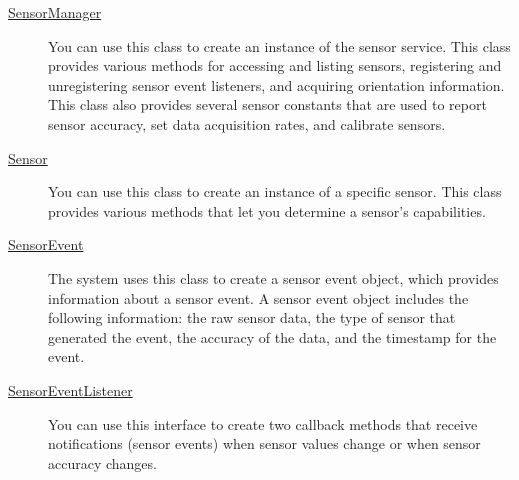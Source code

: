\begin{description}
\item [  \href{https://developer.android.com/reference/android/hardware/SensorManager.html}{SensorManager}]

  You can use this class to create an instance of the sensor service. This class
  provides various methods for accessing and listing sensors, registering and
  unregistering sensor event listeners, and acquiring orientation information.
  This class also provides several sensor constants that are used to report sensor
  accuracy, set data acquisition rates, and calibrate sensors.

\item [
  \href{https://developer.android.com/reference/android/hardware/Sensor.html}{Sensor}]

  You can use this class to create an instance of a specific sensor. This class
  provides various methods that let you determine a sensor's capabilities.

\item[\href{https://developer.android.com/reference/android/hardware/SensorEvent.html}{SensorEvent}]

  The system uses this class to create a sensor event object, which provides
  information about a sensor event. A sensor event object includes the following
  information: the raw sensor data, the type of sensor that generated the event,
  the accuracy of the data, and the timestamp for the event.

\item[\href{https://developer.android.com/reference/android/hardware/SensorEventListener.html}{SensorEventListener}]

  You can use this interface to create two callback methods that receive
  notifications (sensor events) when sensor values change or when sensor accuracy
  changes.
\end{description}


